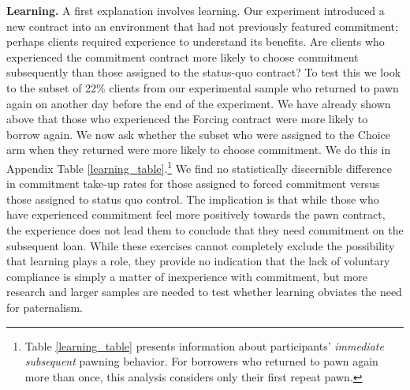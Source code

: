 \documentclass[11pt, a4paper]{article}
\begin{document}
\vspace{.2in}
\noindent \textbf{Learning.} A first explanation involves learning. Our experiment introduced a new contract into an environment that had not previously featured commitment; perhaps clients required experience to understand its benefits. Are clients who experienced the commitment contract more likely to choose commitment subsequently than those assigned to the status-quo contract? To test this we look to the subset of 22\% clients from our experimental sample who returned to pawn again on another day before the end of the experiment. We have already shown above that those who experienced the Forcing contract were more likely to borrow again.  We now ask whether the subset who were assigned to the Choice arm when they returned were more likely to choose commitment.  We do this in Appendix Table \ref{learning_table}.\footnote{Table \ref{learning_table} presents information about participants' \emph{immediate subsequent} pawning behavior.  For borrowers who returned to pawn again more than once, this analysis considers only their first repeat pawn.}
We find no statistically discernible difference in commitment take-up rates for those assigned to forced commitment versus those assigned to status quo control. The implication is that while those who have experienced commitment feel more positively towards the pawn contract, the experience does not lead them to conclude that they need commitment on the subsequent loan.  While these exercises cannot completely exclude the possibility that learning plays a role, they provide no indication that the lack of voluntary compliance is simply a matter of inexperience with commitment, but more research and larger samples are needed to test whether learning obviates the need for paternalism.
\end{document}
